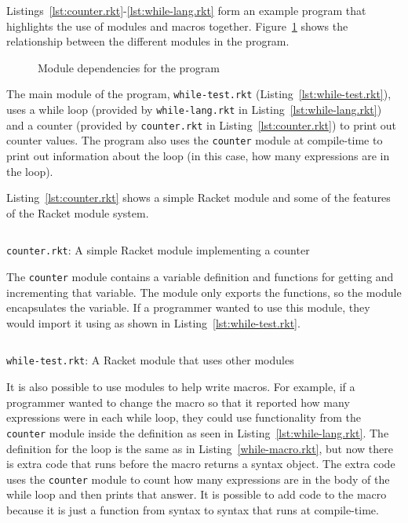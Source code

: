 Listings~\ref{lst:counter.rkt}-\ref{lst:while-lang.rkt} form an example program that highlights the use of modules and macros together.
Figure~\ref{fig:modules.tex} shows the relationship between the different modules in the program.
\begin{figure}
  
  \caption{Module dependencies for the  program}
  \label{fig:modules.tex}
\end{figure}
The main module of the program, \texttt{while-test.rkt} (Listing~\ref{lst:while-test.rkt}), uses a while loop (provided by \texttt{while-lang.rkt} in Listing~\ref{lst:while-lang.rkt}) and a counter (provided by \texttt{counter.rkt} in Listing~\ref{lst:counter.rkt}) to print out counter values.
The program also uses the \texttt{counter} module at compile-time to print out information about the  loop (in this case, how many expressions are in the  loop).

Listing~\ref{lst:counter.rkt} shows a simple Racket module and some of the features of the Racket module system.
\begin{listing}[tb]
  \inputminted{racket}{listings/counter.rkt}
  \caption{\texttt{counter.rkt}: A simple Racket module implementing a counter}
  \label{lst:counter.rkt}
\end{listing}
The \texttt{counter} module contains a variable definition and functions for getting and incrementing that variable.
The module only exports the functions, so the module encapsulates the variable.
If a programmer wanted to use this module, they would import it using  as shown in Listing~\ref{lst:while-test.rkt}. 

\begin{listing}[tb]
  \inputminted{racket}{listings/while-test.rkt}
  \caption{\texttt{while-test.rkt}: A Racket module that uses other modules}
  \label{lst:while-test.rkt}
\end{listing}

It is also possible to use modules to help write macros.
For example, if a programmer wanted to change the  macro so that it reported how many expressions were in each while loop, they could use functionality from the \texttt{counter} module inside the  definition as seen in Listing~\ref{lst:while-lang.rkt}.
The definition for the  loop is the same as in Listing~\ref{while-macro.rkt}, but now there is extra code that runs before the macro returns a syntax object.
The extra code uses the \texttt{counter} module to count how many expressions are in the body of the while loop and then prints that answer.
It is possible to add code to the  macro because it is just a function from syntax to syntax that runs at compile-time. 


